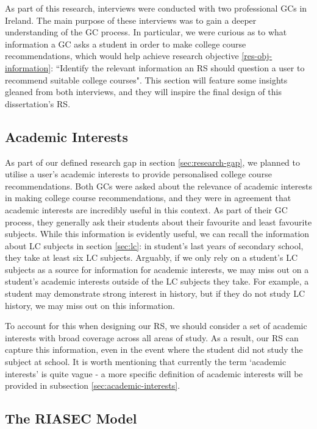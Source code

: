 As part of this research, interviews were conducted with two professional GCs in Ireland.
The main purpose of these interviews was to gain a deeper understanding of the GC process.
In particular, we were curious as to what information a GC asks a student in order to make 
college course recommendations,
which would help achieve research objective \ref{res-obj-information}: ``Identify the relevant information an RS should question a user to recommend suitable college courses".
This section will feature some insights gleaned from both interviews,
and they will inspire the final design of this dissertation's RS.

\subsection{Academic Interests}
\label{sec:academic-interests-gc}

As part of our defined research gap in section \ref{sec:research-gap}, we planned to utilise a user's academic interests
to provide personalised college course recommendations.
Both GCs were asked about the relevance of academic interests in making college course recommendations,
and they were in agreement that academic interests are incredibly useful in this context.
As part of their GC process, they generally ask their students about their favourite and least favourite subjects.
While this information is evidently useful, we can recall the information about LC subjects in section \ref{sec:lc}:
in student's last years of secondary school, they take at least six LC subjects.
Arguably, if we only rely on a student's LC subjects as a source for information for academic interests,
we may miss out on a student's academic interests outside of the LC subjects they take.
For example, a student may demonstrate strong interest in history, but if they do not study LC history,
we may miss out on this information.

To account for this when designing our RS, 
we should consider a set of academic interests with broad coverage across all areas of study.
As a result, our RS can capture this information, even in the event where the student did not study the subject at school.
It is worth mentioning that currently the term `academic interests' is quite vague - 
a more specific definition of academic interests will be provided in subsection \ref{sec:academic-interests}.

\subsection{The RIASEC Model}

